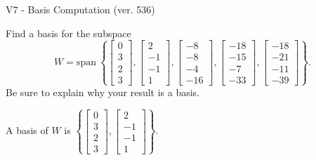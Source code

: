 \begin{exercise}
  \begin{exerciseTitle}V7 - Basis Computation (ver. 536)\end{exerciseTitle}
  \begin{exerciseStatement}
    Find a basis for the subspace 
\[W=\mathrm{span}\ \left\{\left[\begin{array}{r}
0 \\
3 \\
2 \\
3
\end{array}\right] , \left[\begin{array}{r}
2 \\
-1 \\
-1 \\
1
\end{array}\right] , \left[\begin{array}{r}
-8 \\
-8 \\
-4 \\
-16
\end{array}\right] , \left[\begin{array}{r}
-18 \\
-15 \\
-7 \\
-33
\end{array}\right] , \left[\begin{array}{r}
-18 \\
-21 \\
-11 \\
-39
\end{array}\right]\right\}.\]
 Be sure to explain why your result is a basis.


  \end{exerciseStatement}
  \begin{exerciseAnswer}
   A basis of \(W\) is  \(\left\{\left[\begin{array}{r}
0 \\
3 \\
2 \\
3
\end{array}\right] , \left[\begin{array}{r}
2 \\
-1 \\
-1 \\
1
\end{array}\right]\right\}\).
  


  \end{exerciseAnswer}
\end{exercise}